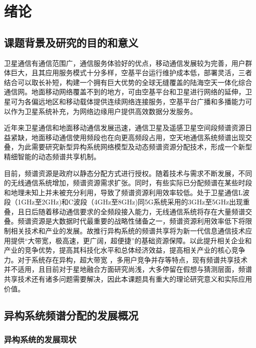 \chapter{绪论}
\section{课题背景及研究的目的和意义}
卫星通信有通信范围广，通信服务体验好的优点，移动通信发展较为完善，用户群体巨大，且其应用服务模式十分多样，空基平台运行维护成本低，部署灵活，三者结合可以取长补短，构建一个拥有巨大优势的全球无缝覆盖的陆海空天一体化综合通信网。地面移动网络覆盖不到的地方，可由空基平台和卫星进行网络的延伸，卫星可为各偏远地区和移动载体提供连续网络连接服务，空基平台广播和多播能力可以作为卫星系统补充，为网络边缘用户提供高效数据分发服务。

近年来卫星通信和地面移动通信发展迅速，通信卫星及遥感卫星空间段频谱资源日益紧缺，地面移动通信使用频段也在向更高频段占用，空天地通信系统频谱出现交叠，为此需要研究新型异构系统网络模型及动态频谱资源分配技术，形成一个新型精细智能的动态频谱共享机制。

目前，频谱资源是政府以静态分配方式进行授权。随着技术与需求不断发展，不同的无线通信系统增加，频谱资源需求扩张。同时，有些实际已分配频谱在某些时段和地理未知上并未被充分利用，导致了频谱资源利用效率较低。处于卫星通信L波段（1GHz至2GHz)和C波段（4GHz至8GHz)同5G系统采用的3GHz至5GHz出现重叠，且日后随着移动通信要求的全频段接入能力，无线通信系统将存在大量频谱交叠。频谱资源是大数据时代最重要的战略性储备之一，频谱资源利用效率低下将限制相关技术和产业的发展。故推行异构系统的频谱共享将为新一代信息通信技术应用提供“大带宽，极高速，更广阔，超便捷”的基础资源保障。以此提升相关企业和产业的竞争优势，提高其科技化水平和总体经济效益，提高相关产业的核心竞争力。对于系统存在异构，超大带宽 ，多用户竞争并存等特点，现有频谱共享技术并不适用，且目前对于星地融合方面研究尚浅，大多停留在假想与猜测层面，频谱共享技术还有诸多问题需要解决，因此本课题具有重大的理论研究意义和实际应用价值。

\section{异构系统频谱分配的发展概况}
\subsection{异构系统的发展现状}

